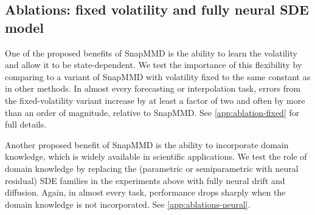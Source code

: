 \subsection{Ablations: fixed volatility and fully neural SDE model}
\label{sec:ablations}

One of the proposed benefits of SnapMMD is the ability to learn the volatility and allow it to be state-dependent. We test the importance of this flexibility by comparing to a variant of SnapMMD with volatility fixed to the same constant as in other methods. In almost every forecasting or interpolation task, errors from the fixed-volatility variant increase by at least a factor of two and often by more than an order of magnitude, relative to SnapMMD. See \cref{app:ablation-fixed} for full details.

Another proposed benefit of SnapMMD is the ability to incorporate domain knowledge, which is widely available in scientific applications. We test the role of domain knowledge by replacing the (parametric or semiparametric with neural residual) SDE families in the experiments above with fully neural drift and diffusion. Again, in almost every task, performance drops sharply when the domain knowledge is not incorporated. See \cref{app:ablations-neural}. 


